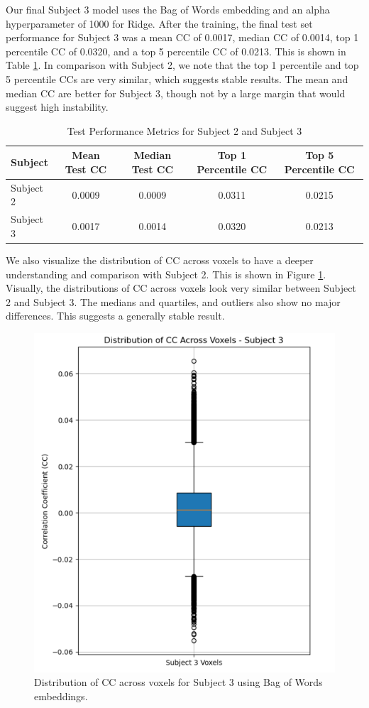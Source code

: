 \documentclass[10pt,letterpaper]{article}
\begin{document}
Our final Subject 3 model uses the Bag of Words embedding and an alpha hyperparameter of 1000 for Ridge. After the training, the final test set performance for Subject 3 was a mean CC of 0.0017, median CC of 0.0014, top 1 percentile CC of 0.0320, and a top 5 percentile CC of 0.0213. This is shown in Table \ref{tab:subject_performance}. In comparison with Subject 2, we note that the top 1 percentile and top 5 percentile CCs are very similar, which suggests stable results. The mean and median CC are better for Subject 3, though not by a large margin that would suggest high instability.

\begin{table}[ht]
  \centering
  \caption{Test Performance Metrics for Subject 2 and Subject 3}
  \label{tab:subject_performance}
  \begin{tabular}{lcccc}
    \hline
    \textbf{Subject} & \textbf{Mean Test CC} & \textbf{Median Test CC} & \textbf{Top 1 Percentile CC} & \textbf{Top 5 Percentile CC} \\
    \hline
    Subject 2        & 0.0009                & 0.0009                 & 0.0311                     & 0.0215                      \\
    Subject 3        & 0.0017                & 0.0014                 & 0.0320                     & 0.0213                      \\
    \hline
  \end{tabular}
\end{table}

We also visualize the distribution of CC across voxels to have a deeper understanding and comparison with Subject 2. This is shown in Figure \ref{fig:cc_dist_voxels_subject_3}. Visually, the distributions of CC across voxels look very similar between Subject 2 and Subject 3. The medians and quartiles, and outliers also show no major differences. This suggests a generally stable result.

\begin{figure}
    \centering
    \includegraphics[width=0.5\linewidth]{figs/cc_dist_voxels_subject_3.png}
    \caption{Distribution of CC across voxels for Subject 3 using Bag of Words embeddings.}
    \label{fig:cc_dist_voxels_subject_3}
\end{figure}
\end{document}
